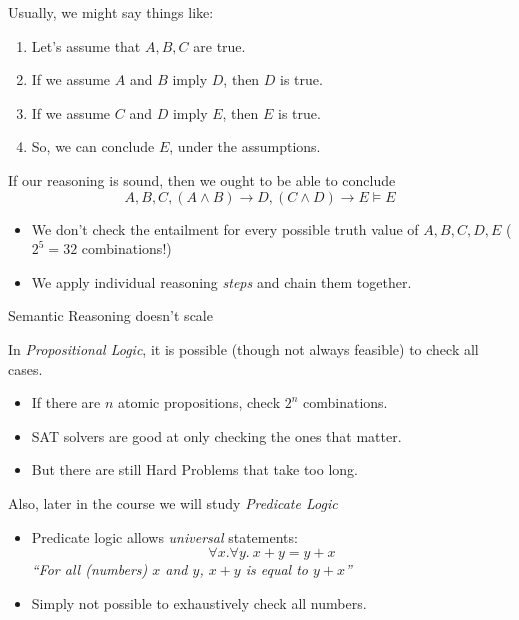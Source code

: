 \documentclass[xetex,aspectratio=169,14pt,hyperref={pdfpagelabels=true,pdflang={en-GB}}]{beamer}
\begin{document}
\begin{frame}
  Usually, we might say things like:
  \begin{enumerate}
  \item Let's assume that $A, B, C$ are true.
  \item If we assume $A$ and $B$ imply $D$, then $D$ is true.
  \item If we assume $C$ and $D$ imply $E$, then $E$ is true.
  \item So, we can conclude $E$, under the assumptions.
  \end{enumerate}
  If our reasoning is sound, then we ought to be able to conclude
  \begin{displaymath}
    A, B, C, (A \land B) \to D, (C \land D) \to E \models E
  \end{displaymath}

  \pause
  \begin{itemize}
  \item We don't check the entailment for every possible truth value of $A, B, C, D, E$ \qquad \textcolor{black!60}{($2^5 = 32$ combinations!)}
  \item We apply individual reasoning \emph{steps} and chain them together.
  \end{itemize}
\end{frame}

\begin{frame}
  {Semantic Reasoning doesn't scale}

  In \emph{Propositional Logic}, it is possible (though not always
  feasible) to check all cases.
  \begin{itemize}
  \item If there are $n$ atomic propositions, check $2^n$ combinations.
  \item SAT solvers are good at only checking the ones that matter.
  \item But there are still Hard Problems that take too long.
  \end{itemize}

  \pause
  \bigskip

  Also, later in the course we will study \emph{Predicate Logic}
  \begin{itemize}
  \item Predicate logic allows \emph{universal} statements:
    \begin{displaymath}
      \forall x.\forall y.~x+y = y+x
    \end{displaymath}
    \emph{``For all (numbers) $x$ and $y$, $x+y$ is equal to $y+x$''}
  \item Simply not possible to exhaustively check all numbers.
  \end{itemize}
\end{frame}
\end{document}
